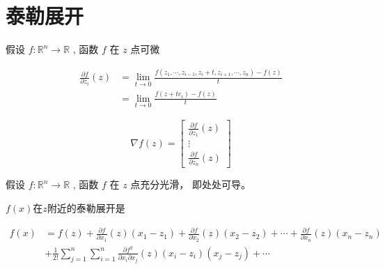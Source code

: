 \section{泰勒展开}

\begin{definition}[函数$f$第$i$个分量的一阶偏导数]
    假设 $ f: \mathbb{R}^{n} \rightarrow \mathbb{R} $ , 函数 $ f $ 在 $ z $ 点可微

    \begin{equation} \begin{aligned} \frac{\partial f}{\partial z_{i}}(z) &=\lim _{t \rightarrow 0} \frac{f\left(z_{1}, \cdots, z_{i-1}, z_{i}+t, z_{i+1}, \cdots, z_{n}\right)-f(z)}{t} \\ &=\lim _{t \rightarrow 0} \frac{f\left(z+t e_{i}\right)-f(z)}{t} \end{aligned} \end{equation}
\end{definition}

\begin{definition}[$f$在点$z$的梯度]
    \begin{equation} \nabla f(z)=\left[\begin{array}{c}\frac{\partial f}{\partial z_{1}}(z) \\ \vdots \\ \frac{\partial f}{\partial z_{n}}(z)\end{array}\right] \end{equation}
\end{definition}

\begin{definition}
    假设 $ f: \mathbb{R}^{n} \rightarrow \mathbb{R} $ , 函数 $ f $ 在 $ z $ 点充分光滑， 即处处可导。

    $f(x)$在$z$附近的泰勒展开是

    \begin{equation}\begin{aligned} f(x)&=f(z)+\frac{\partial f}{\partial x_{1}}(z)\left(x_{1}-z_{1}\right)+\frac{\partial f}{\partial x_{2}}(z)\left(x_{2}-z_{2}\right)+\cdots+\frac{\partial f}{\partial x_{n}}(z)\left(x_{n}-z_{n}\right) 
    \\ & +\frac{1}{2 !} \sum_{j=1}^{n} \sum_{i=1}^{n} \frac{\partial f^{2}}{\partial x_{i} \partial x_{j}}(z)\left(x_{i}-z_{i}\right)\left(x_{{j}}-z_{j}\right)+\cdots \end{aligned}\end{equation}
\end{definition}


